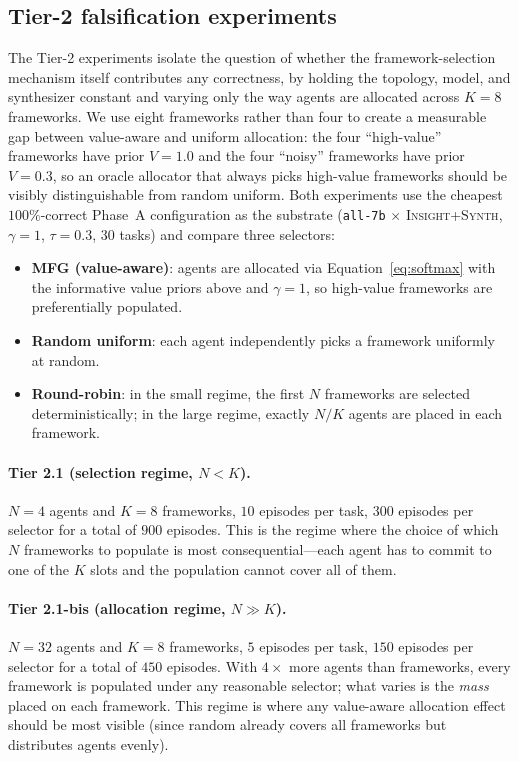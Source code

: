 \documentclass[11pt]{amsart}
\newcommand{\g}{\gamma}
\newcommand\1{{\mathds{1}}}
\theoremstyle{definition}
\theoremstyle{remark}
\numberwithin{equation}{section}
\begin{document}
\subsection{Tier-2 falsification experiments}\label{sec:tier2}

The Tier-2 experiments isolate the question of whether the framework-selection mechanism itself contributes any correctness, by holding the topology, model, and synthesizer constant and varying only the way agents are allocated across $K\!=\!8$ frameworks.
We use eight frameworks rather than four to create a measurable gap between value-aware and uniform allocation: the four ``high-value'' frameworks have prior $V\!=\!1.0$ and the four ``noisy'' frameworks have prior $V\!=\!0.3$, so an oracle allocator that always picks high-value frameworks should be visibly distinguishable from random uniform.
Both experiments use the cheapest $100\%$-correct Phase~A configuration as the substrate (\texttt{all-7b} $\times$ \textsc{Insight+Synth}, $\g\!=\!1$, $\tau\!=\!0.3$, $30$ tasks) and compare three selectors:
\begin{itemize}[leftmargin=1.2em, itemsep=1pt]
\item \textbf{MFG (value-aware)}: agents are allocated via Equation~\eqref{eq:softmax} with the informative value priors above and $\g\!=\!1$, so high-value frameworks are preferentially populated.
\item \textbf{Random uniform}: each agent independently picks a framework uniformly at random.
\item \textbf{Round-robin}: in the small regime, the first $N$ frameworks are selected deterministically; in the large regime, exactly $N/K$ agents are placed in each framework.
\end{itemize}

\paragraph{Tier 2.1 (selection regime, $N\!<\!K$).}
$N\!=\!4$ agents and $K\!=\!8$ frameworks, $10$ episodes per task, $300$ episodes per selector for a total of $900$ episodes.
This is the regime where the choice of which $N$ frameworks to populate is most consequential---each agent has to commit to one of the $K$ slots and the population cannot cover all of them.

\paragraph{Tier 2.1-bis (allocation regime, $N\!\gg\!K$).}
$N\!=\!32$ agents and $K\!=\!8$ frameworks, $5$ episodes per task, $150$ episodes per selector for a total of $450$ episodes.
With $4\times$ more agents than frameworks, every framework is populated under any reasonable selector; what varies is the \emph{mass} placed on each framework.
This regime is where any value-aware allocation effect should be most visible (since random already covers all frameworks but distributes agents evenly).
\end{document}
